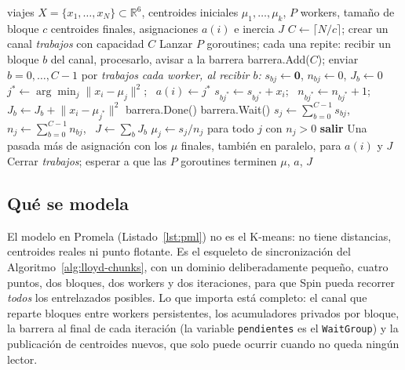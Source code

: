 \begin{algorithm}[H]
\caption{Lloyd concurrente con worker pool, bloques por canal y acumuladores por bloque}
\label{alg:lloyd-chunks}
\begin{algorithmic}[1]
\Require viajes $X = \{x_1, \dots, x_N\} \subset \mathbb{R}^6$, centroides iniciales
         $\mu_1, \dots, \mu_k$, $P$ workers, tamaño de bloque $c$
\Ensure centroides finales, asignaciones $a(i)$ e inercia $J$
\State $C \gets \lceil N / c \rceil$; crear un canal \textit{trabajos} con capacidad $C$
\State Lanzar $P$ goroutines; cada una repite: recibir un bloque $b$ del canal, procesarlo, avisar
       a la barrera 
  \State barrera.Add($C$); enviar $b = 0, \dots, C-1$ por \textit{trabajos}
  \Statex \hspace{\algorithmicindent} \textit{cada worker, al recibir $b$:} 
  \State \hspace{\algorithmicindent} $s_{bj} \gets \mathbf{0}$, $n_{bj} \gets 0$, $J_b \gets 0$
    \State $j^{*} \gets \arg\min_j \lVert x_i - \mu_j \rVert^2$; \ $a(i) \gets j^{*}$
    \State $s_{bj^{*}} \gets s_{bj^{*}} + x_i$; \ $n_{bj^{*}} \gets n_{bj^{*}} + 1$;
           \ $J_b \gets J_b + \lVert x_i - \mu_{j^{*}} \rVert^2$
  \EndFor
  \State \hspace{\algorithmicindent} barrera.Done()
  \State barrera.Wait() 
  \State $s_j \gets \sum_{b=0}^{C-1} s_{bj}$, \ $n_j \gets \sum_{b=0}^{C-1} n_{bj}$,
         \ $J \gets \sum_b J_b$ 
  \State $\mu_j \gets s_j / n_j$ para todo $j$ con $n_j > 0$
   \textbf{salir} \EndIf
\EndFor
\State Una pasada más de asignación con los $\mu$ finales, también en paralelo, para $a(i)$ y $J$
\State Cerrar \textit{trabajos}; esperar a que las $P$ goroutines terminen
\State \Return $\mu$, $a$, $J$
\end{algorithmic}
\end{algorithm}

\subsection{Qué se modela}

El modelo en Promela (Listado~\ref{lst:pml}) no es el K-means: no tiene distancias, centroides
reales ni punto flotante. Es el esqueleto de sincronización del Algoritmo~\ref{alg:lloyd-chunks},
con un dominio deliberadamente pequeño, cuatro puntos, dos bloques, dos workers y dos iteraciones,
para que Spin pueda recorrer \emph{todos} los entrelazados posibles. Lo que importa está completo:
el canal que reparte bloques entre workers persistentes, los acumuladores privados por bloque, la
barrera al final de cada iteración (la variable \texttt{pendientes} es el \texttt{WaitGroup}) y la
publicación de centroides nuevos, que solo puede ocurrir cuando no queda ningún lector.

